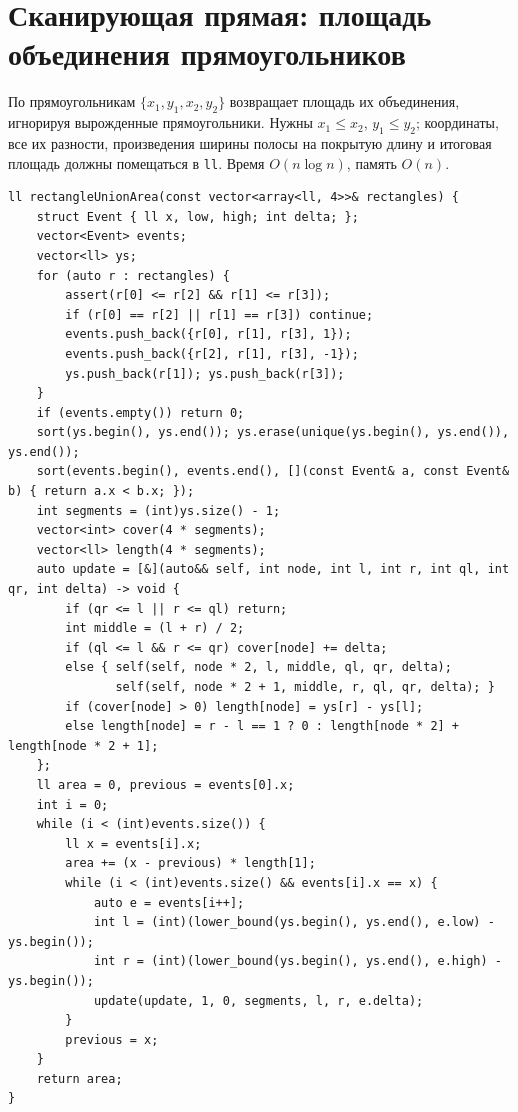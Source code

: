 \section{Сканирующая прямая: площадь объединения прямоугольников}
По прямоугольникам $\{x_1,y_1,x_2,y_2\}$ возвращает площадь их объединения, игнорируя вырожденные прямоугольники.
Нужны $x_1\le x_2$, $y_1\le y_2$; координаты, все их разности, произведения ширины полосы на покрытую длину и итоговая площадь должны помещаться в \texttt{ll}.
Время $O(n\log n)$, память $O(n)$.
\begin{lstlisting}[name=optimization_sweep]
ll rectangleUnionArea(const vector<array<ll, 4>>& rectangles) {
    struct Event { ll x, low, high; int delta; };
    vector<Event> events;
    vector<ll> ys;
    for (auto r : rectangles) {
        assert(r[0] <= r[2] && r[1] <= r[3]);
        if (r[0] == r[2] || r[1] == r[3]) continue;
        events.push_back({r[0], r[1], r[3], 1});
        events.push_back({r[2], r[1], r[3], -1});
        ys.push_back(r[1]); ys.push_back(r[3]);
    }
    if (events.empty()) return 0;
    sort(ys.begin(), ys.end()); ys.erase(unique(ys.begin(), ys.end()), ys.end());
    sort(events.begin(), events.end(), [](const Event& a, const Event& b) { return a.x < b.x; });
    int segments = (int)ys.size() - 1;
    vector<int> cover(4 * segments);
    vector<ll> length(4 * segments);
    auto update = [&](auto&& self, int node, int l, int r, int ql, int qr, int delta) -> void {
        if (qr <= l || r <= ql) return;
        int middle = (l + r) / 2;
        if (ql <= l && r <= qr) cover[node] += delta;
        else { self(self, node * 2, l, middle, ql, qr, delta);
               self(self, node * 2 + 1, middle, r, ql, qr, delta); }
        if (cover[node] > 0) length[node] = ys[r] - ys[l];
        else length[node] = r - l == 1 ? 0 : length[node * 2] + length[node * 2 + 1];
    };
    ll area = 0, previous = events[0].x;
    int i = 0;
    while (i < (int)events.size()) {
        ll x = events[i].x;
        area += (x - previous) * length[1];
        while (i < (int)events.size() && events[i].x == x) {
            auto e = events[i++];
            int l = (int)(lower_bound(ys.begin(), ys.end(), e.low) - ys.begin());
            int r = (int)(lower_bound(ys.begin(), ys.end(), e.high) - ys.begin());
            update(update, 1, 0, segments, l, r, e.delta);
        }
        previous = x;
    }
    return area;
}
\end{lstlisting}
%

